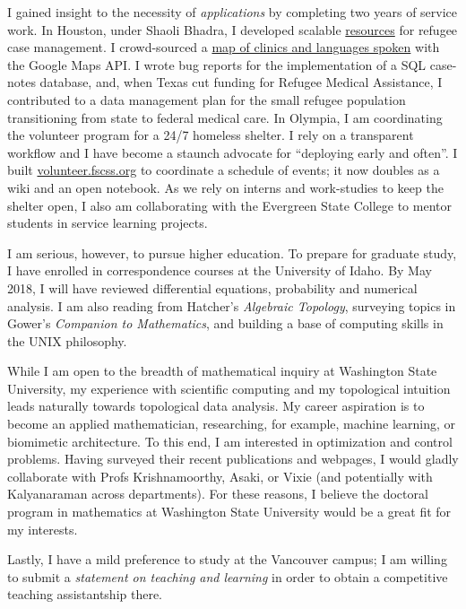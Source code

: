 \documentclass{article}
\begin{document}
I gained insight to the necessity of \emph{applications} by completing two years of service work. In Houston, under Shaoli Bhadra, I developed scalable \href{https://github.com/coltongrainger/ymca-resources}{resources} for refugee case management. I crowd-sourced a \href{https://drive.google.com/open?id=1kk9yn6-4nifHLIf2tGYbW_7PiYo\&usp=sharing}{map of clinics and languages spoken} with the Google Maps API. I wrote bug reports for the implementation of a SQL case-notes database, and, when Texas cut funding for Refugee Medical Assistance, I contributed to a data management plan for the small refugee population transitioning from state to federal medical care. In Olympia, I am coordinating the volunteer program for a 24/7 homeless shelter. I rely on a transparent workflow and I have become a staunch advocate for ``deploying early and often''. I built \href{http://volunteer.fscss.org}{volunteer.fscss.org} to coordinate a schedule of events; it now doubles as a wiki and an open notebook. As we rely on interns and work-studies to keep the shelter open, I also am collaborating with the Evergreen State College to mentor students in service learning projects.

I am serious, however, to pursue higher education. To prepare for graduate study, I have enrolled in correspondence courses at the University of Idaho. By May 2018, I will have reviewed differential equations, probability and numerical analysis. I am also reading from Hatcher's \emph{Algebraic Topology}, surveying topics in Gower's \emph{Companion to Mathematics}, and building a base of computing skills in the UNIX philosophy.

While I am open to the breadth of mathematical inquiry at Washington State University, my experience with scientific computing and my topological intuition leads naturally towards topological data analysis. My career aspiration is to become an applied mathematician, researching, for example, machine learning, or biomimetic architecture. To this end, I am interested in optimization and control problems. Having surveyed their recent publications and webpages, I would gladly collaborate with Profs Krishnamoorthy, Asaki, or Vixie (and potentially with Kalyanaraman across departments). For these reasons, I believe the doctoral program in mathematics at Washington State University would be a great fit for my interests.

Lastly, I have a mild preference to study at the Vancouver campus; I am willing to submit a \emph{statement on teaching and learning} in order to obtain a competitive teaching assistantship there.
\end{document}
